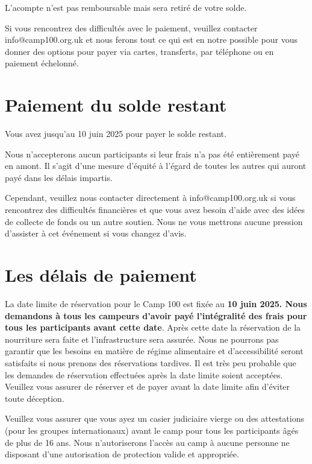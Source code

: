 \documentclass[a4paper, 11pt]{report}
\begin{document}
L'acompte n'est pas remboursable mais sera retir\'e de votre solde.

Si vous rencontrez des difficult\'es avec le paiement, veuillez contacter info@camp100.org.uk et nous ferons tout ce qui est en notre possible pour vous donner des options pour payer via cartes, transferts, par t\'el\'ephone ou en paiement \'echelonn\'e.

\section{Paiement du solde restant}
Vous avez jusqu'au 10 juin 2025 pour payer le solde restant.

Nous n'accepterons aucun participants si leur frais n'a pas \'et\'e enti\`erement pay\'e en amont. Il s'agit d'une mesure d'\'equit\'e \`a l'\'egard de toutes les autres qui auront pay\'e dans les d\'elais impartis.

Cependant, veuillez nous contacter directement \`a info@camp100.org.uk si vous rencontrez des difficult\'es financi\`eres et que vous avez besoin d'aide avec des id\'ees de collecte de fonds ou un autre soutien. Nous ne vous mettrons aucune pression d'assister \`a cet \'ev\'enement si vous changez d'avis.

\section{Les d\'elais de paiement}
La date limite de r\'eservation pour le Camp 100 est fix\'ee au \textbf{10 juin 2025. Nous demandons \`a tous les campeurs d'avoir pay\'e l'int\'egralit\'e des frais pour tous les participants avant cette date}. Apr\`es cette date la r\'eservation de la nourriture sera faite et l'infrastructure sera assur\'ee. Nous ne pourrons pas garantir que les besoins en mati\`ere de r\'egime alimentaire et d'accessibilit\'e seront satisfaits si nous prenons des r\'eservations tardives. Il est tr\`es peu probable que les demandes de r\'eservation effectu\'ees apr\`es la date limite soient accept\'ees. Veuillez vous assurer de r\'eserver et de payer avant la date limite afin d'\'eviter toute d\'eception. 

Veuillez vous assurer que vous ayez un casier judiciaire vierge ou des attestations (pour les groupes internationaux) avant le camp pour tous les participants \^ag\'es de plus de 16 ans. Nous n'autoriserons l'acc\`es au camp \`a aucune personne ne disposant d'une autorisation de protection valide et appropri\'ee. 
\end{document}
